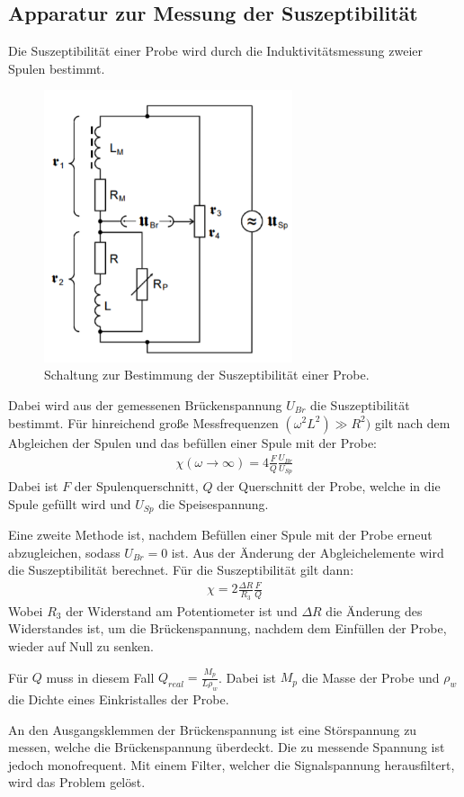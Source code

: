 \subsection{Apparatur zur Messung der Suszeptibilität}
Die Suszeptibilität einer Probe wird durch die Induktivitätsmessung zweier Spulen bestimmt.

\begin{figure}[H]
  \centering
  \includegraphics[height=8cm]{brueckenschaltung.PNG}
  \caption{Schaltung zur Bestimmung der Suszeptibilität einer Probe. \cite{sample}}
  \label{fig:bruecke}
\end{figure}

Dabei wird aus der gemessenen Brückenspannung $U_{Br}$ die Suszeptibilität bestimmt. Für hinreichend große Messfrequenzen
$(\omega^2 L^2) \gg R^2)$ gilt nach dem Abgleichen der Spulen und das befüllen einer Spule mit der Probe:
\begin{align}
  \chi(\omega \rightarrow \infty) = 4 \frac{F}{Q} \frac{U_{Br}}{U_{Sp}}
\end{align}
Dabei ist $F$ der Spulenquerschnitt, $Q$ der Querschnitt der Probe, welche in die Spule gefüllt wird und $U_{Sp}$ die
Speisespannung.

Eine zweite Methode ist, nachdem Befüllen einer Spule mit der Probe erneut abzugleichen, sodass $U_{Br} = 0$ ist. Aus
der Änderung der Abgleichelemente wird die Suszeptibilität berechnet. Für die Suszeptibilität gilt dann:
\begin{align}
  \chi = 2 \frac{\Delta R}{R_3} \frac{F}{Q}
\end{align}
Wobei $R_3$ der Widerstand am Potentiometer ist und $\Delta R$ die Änderung des Widerstandes ist, um die
Brückenspannung, nachdem dem Einfüllen der Probe, wieder auf Null zu senken.

Für $Q$ muss in diesem Fall $Q_{real} = \frac{M_p}{L \rho_w}$. Dabei ist $M_p$ die Masse der Probe und $\rho_w$ die Dichte
eines Einkristalles der Probe.


An den Ausgangsklemmen der Brückenspannung ist eine Störspannung zu messen, welche die Brückenspannung überdeckt. Die
zu messende Spannung ist jedoch monofrequent. Mit einem Filter, welcher die Signalspannung herausfiltert,
wird das Problem gelöst.
